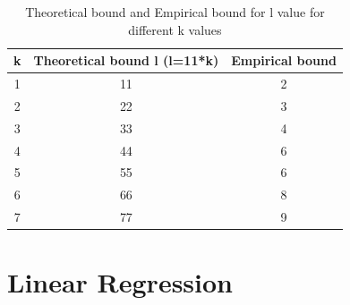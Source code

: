 \documentclass[11pt]{article}
\begin{document}
\begin{itemize}
	\begin{table}[h]
		\centering
		\begin{tabular}{|c|c|c|}
			\hline
			\textbf{k}  & \textbf{Theoretical bound l (l=11*k)} & \textbf{Empirical bound}\\
			\hline
			1 &  11 & 2 \\
			\hline
			2&  22 & 3\\
			\hline
			3 &  33  & 4\\
			\hline
			4 &  44  & 6 \\
			\hline
			5 & 55 & 6\\
			\hline
			6 & 66 & 8\\
			\hline
			7 & 77 & 9\\
			\hline	
		\end{tabular}
		\caption{Theoretical bound and Empirical bound for l value for different k values}
		\label{t2}
	\end{table}
	
	
	
	
\end{itemize}


\section{Linear Regression}
\end{document}
